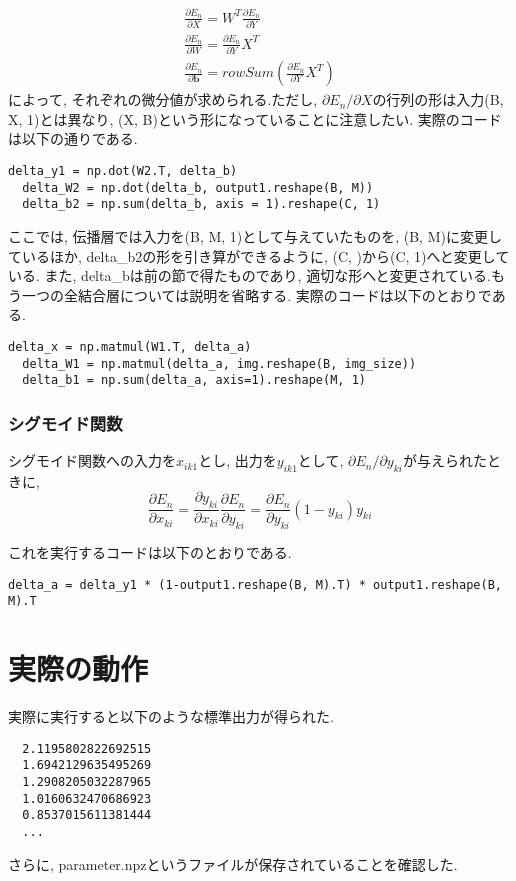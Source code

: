 \documentclass[a4paper,11pt]{jsarticle}
\begin{document}
\begin{gather}
  \frac{\partial E_n}{\partial X} = W^T \frac{\partial E_n}{\partial Y} \\
  \frac{\partial E_n}{\partial W} = \frac{\partial E_n}{\partial Y} X^T \\
  \frac{\partial E_n}{\partial \bm{b}} = rowSum (\frac{\partial E_n}{\partial Y} X^T)
\end{gather}
によって, それぞれの微分値が求められる.ただし, 
$\partial E_n / \partial X$の行列の形は入力(B, X, 1)とは異なり, 
(X, B)という形になっていることに注意したい.
実際のコードは以下の通りである.
\begin{lstlisting}[caption = 全結合層2]
  delta_y1 = np.dot(W2.T, delta_b)
  delta_W2 = np.dot(delta_b, output1.reshape(B, M))
  delta_b2 = np.sum(delta_b, axis = 1).reshape(C, 1)
\end{lstlisting}
\par
ここでは, 伝播層では入力を(B, M, 1)として与えていたものを,
(B, M)に変更しているほか, delta\_b2の形を引き算ができるように,
(C, )から(C, 1)へと変更している. また, delta\_bは前の節で得たものであり,
適切な形へと変更されている.もう一つの全結合層については説明を省略する.
実際のコードは以下のとおりである.
\begin{lstlisting}[caption = 全結合層1]
  delta_x = np.matmul(W1.T, delta_a)
  delta_W1 = np.matmul(delta_a, img.reshape(B, img_size))
  delta_b1 = np.sum(delta_a, axis=1).reshape(M, 1)
\end{lstlisting}

\subsubsection*{シグモイド関数}
シグモイド関数への入力を$x_{ik1}$とし, 出力を$y_{ik1}$として, 
$ \partial E_n / \partial y_{ki}$が与えられたときに, 
$$ \frac{\partial E_n}{\partial x_{ki}} =
\frac{\partial y_{ki}}{\partial x_{ki}} \frac{\partial E_n}{\partial y_{ki}}=
\frac{\partial E_n}{\partial y_{ki}} (1 - y_{ki}) y_{ki}
$$

これを実行するコードは以下のとおりである.
\begin{lstlisting}[caption=シグモイド関数]
  delta_a = delta_y1 * (1-output1.reshape(B, M).T) * output1.reshape(B, M).T
\end{lstlisting}

\section{実際の動作}
実際に実行すると以下のような標準出力が得られた.
\begin{lstlisting}
  2.1195802822692515
  1.6942129635495269
  1.2908205032287965
  1.0160632470686923
  0.8537015611381444
  ...
\end{lstlisting}
さらに, parameter.npzというファイルが保存されていることを確認した.
\end{document}
